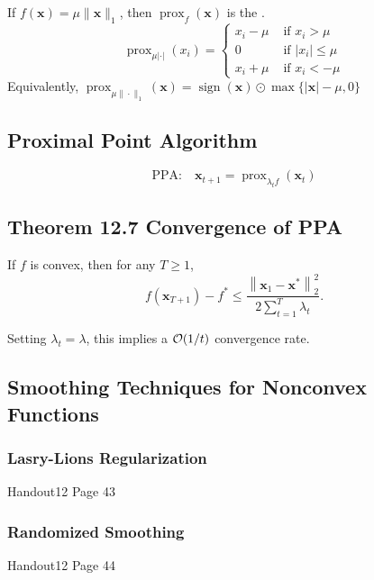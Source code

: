 If $f(\mathbf{x})=\mu\|\mathbf{x}\|_{1}$, then $\operatorname{prox}_{f}(\mathbf{x})$ is the .
$$\operatorname{prox}_{\mu|\cdot|}\left(x_{i}\right)= \begin{cases}x_{i}-\mu & \text { if } x_{i}>\mu \\ 0 & \text { if }\left|x_{i}\right| \leq \mu \\ x_{i}+\mu & \text { if } x_{i}<-\mu\end{cases}$$
Equivalently, $\operatorname{prox}_{\mu\|\cdot\|_{1}}(\mathbf{x})=\operatorname{sign}(\mathbf{x}) \odot \max \{|\mathbf{x}|-\mu, 0\}$






\subsection*{Proximal Point Algorithm}
$$
\text{PPA:} \quad \mathbf{x}_{t+1}=\operatorname{prox}_{\lambda_{t} f}\left(\mathbf{x}_{t}\right)
$$




\subsection*{Theorem 12.7 Convergence of PPA}
If $f$ is convex, then for any $T \geq 1$,
$$
f\left(\mathbf{x}_{T+1}\right)-f^{*} \leq \frac{\left\|\mathbf{x}_{1}-\mathbf{x}^{*}\right\|_{2}^{2}}{2 \sum_{t=1}^{T} \lambda_{t}} .
$$

Setting $\lambda_{t}=\lambda$, this implies a $\operatorname{\mathcal{O}}(1 / t)$ convergence rate.





\subsection*{Smoothing Techniques for Nonconvex Functions}
\subsubsection*{Lasry-Lions Regularization}
Handout12 Page 43
\subsubsection*{Randomized Smoothing}
Handout12 Page 44